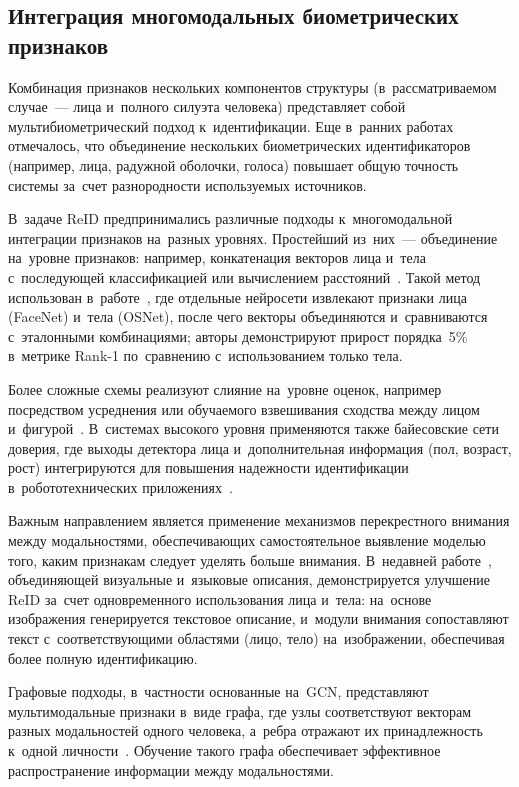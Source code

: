 \subsection{Интеграция многомодальных биометрических признаков}\label{sec:ch2/multimodal}

Комбинация признаков нескольких компонентов структуры (в~рассматриваемом
случае~--- лица и~полного силуэта человека) представляет собой
мультибиометрический подход к~идентификации. Еще в~ранних работах
отмечалось, что объединение нескольких биометрических идентификаторов
(например, лица, радужной оболочки, голоса) повышает общую точность
системы за~счет разнородности используемых источников.

В~задаче ReID предпринимались различные подходы к~многомодальной
интеграции признаков на~разных уровнях. Простейший из~них~--- объединение на~уровне
признаков: например, конкатенация векторов лица и~тела с~последующей
классификацией или вычислением
расстояний~\cite{Koo2018multimodal}. Такой метод использован
в~работе~\cite{Shoukry2022multimodal}, где отдельные нейросети
извлекают признаки лица (FaceNet) и~тела (OSNet), после чего векторы
объединяются и~сравниваются с~эталонными комбинациями; авторы
демонстрируют прирост порядка~5\% в~метрике Rank-1 по~сравнению
с~использованием только тела.

Более сложные схемы реализуют слияние на~уровне оценок, например посредством усреднения или обучаемого взвешивания
сходства между лицом и~фигурой~\cite{Koo2018multimodal}. В~системах
высокого уровня применяются также байесовские сети доверия, где выходы
детектора лица и~дополнительная информация (пол, возраст, рост)
интегрируются для повышения надежности идентификации
в~робототехнических приложениях~\cite{Khachumov2015face}.

Важным направлением является применение механизмов перекрестного
внимания между модальностями, обеспечивающих самостоятельное выявление
моделью того, каким признакам следует уделять больше внимания.
В~недавней работе~\cite{Vezzani2013reidsurvey}, объединяющей визуальные
и~языковые описания, демонстрируется улучшение ReID за~счет
одновременного использования лица и~тела: на~основе изображения
генерируется текстовое описание, и~модули внимания сопоставляют текст
с~соответствующими областями (лицо, тело) на~изображении, обеспечивая
более полную идентификацию.

Графовые подходы, в~частности основанные на~GCN, представляют
мультимодальные признаки в~виде графа, где узлы соответствуют векторам
разных модальностей одного человека, а~ребра отражают их
принадлежность к~одной личности~\cite{Zhong2020personsearch}. Обучение
такого графа обеспечивает эффективное распространение информации между
модальностями.


